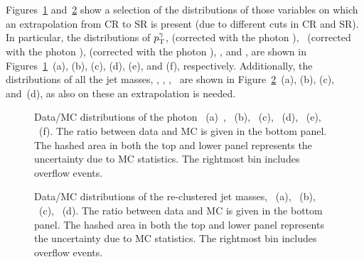 		Figures~\ref{fig:ttV} and~\ref{fig:ttVMasses} show a selection of the distributions of those variables on which an extrapolation from \ac{CR} to \ac{SR} is present (due to different cuts in \ac{CR} and \ac{SR}). In particular, the distributions of $p_{\mathrm{T}}^{\gamma}$, \mttwo (corrected with the photon \pt), \mtbmin\ (corrected with the photon \pt), \mtbmax (corrected with the photon \pt), \HT, and \drbb, are shown in Figures~\ref{fig:ttV}~(a), (b), (c), (d), (e), and (f), respectively. Additionally, the distributions of all the jet masses, \mantikttwelvezero, \mantikttwelveone, \mantikteightzero, \mantikteightone\ are shown in Figure~\ref{fig:ttVMasses}~(a), (b), (c), and~(d), as also on these an extrapolation is needed.

		\begin{figure}[htbp]
		\centering
		\caption{Data/MC distributions of the photon \pt~(a)~\cite{stop0L}, \mttwo~(b), \mtbmin~(c), \mtbmax~(d), \HT~(e), \drbb~(f). The ratio between data and MC is given in the bottom panel. The hashed area in both the top and lower panel represents the uncertainty due to MC statistics. The rightmost bin includes overflow events.}
		\label{fig:ttV} 
		\end{figure}

		\begin{figure}[htbp]
		\centering
		\caption{Data/MC distributions of the re-clustered jet masses, \mantikttwelvezero~(a), \mantikttwelveone~(b), \mantikteightzero~(c), \mantikteightone~(d). The ratio between data and MC is given in the bottom panel. The hashed area in both the top and lower panel represents the uncertainty due to MC statistics. The rightmost bin includes overflow events.}
		\label{fig:ttVMasses} 
		\end{figure}

